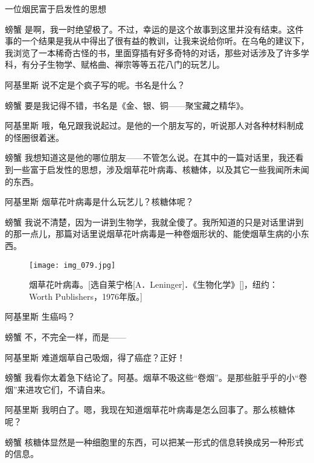 \begin{dialog}{一位烟民富于启发性的思想}
\begin{dialogue}
\item[螃蟹]是啊，我一时绝望极了。不过，幸运的是这个故事到这里并没有结束。这件事的一个结果是我从中得出了很有益的教训，让我来说给你听。在乌龟的建议下，我浏览了一本稀奇古怪的书，里面穿插有好多奇特的对话，那些对话涉及了许多学科，有分子生物学、赋格曲、禅宗等等五花八门的玩艺儿。

\item[阿基里斯]说不定是个疯子写的呢。书名是什么？

\item[螃蟹]要是我记得不错，书名是《金、银、铜——聚宝藏之精华》。

\item[阿基里斯]哦，龟兄跟我说起过。是他的一个朋友写的，听说那人对各种材料制成的怪圈很着迷。

\item[螃蟹]我想知道这是他的哪位朋友——不管怎么说。在其中的一篇对话里，我还看到一些富于启发性的思想，涉及烟草花叶病毒、核糖体，以及其它一些我闻所未闻的东西。

\item[阿基里斯]烟草花叶病毒是什么玩艺儿？核糖体呢？

\item[螃蟹]我说不清楚，因为一讲到生物学，我就全傻了。我所知道的只是对话里讲到的那一点儿，那篇对话里说烟草花叶病毒是一种卷烟形状的、能使烟草生病的小东西。

\begin{figure}
\texttt{[image: img\_079.jpg]}
\caption[烟草花叶病毒。]
  {烟草花叶病毒。[选自莱宁格[A．Leninger]．《生物化学》[]，纽约：Worth Publishers，1976年版。]}
\end{figure}

\item[阿基里斯]生癌吗？

\item[螃蟹]不，不完全一样，而是——

\item[阿基里斯]难道烟草自己吸烟，得了癌症？正好！

\item[螃蟹]我看你太着急下结论了。阿基。烟草不吸这些“卷烟”。是那些脏乎乎的小“卷烟”来进攻它们，不请自来。

\item[阿基里斯]我明白了。嗯，我现在知道烟草花叶病毒是怎么回事了。那么核糖体呢？

\item[螃蟹]核糖体显然是一种细胞里的东西，可以把某一形式的信息转换成另一种形式的信息。


\end{dialogue}
\end{dialog}
